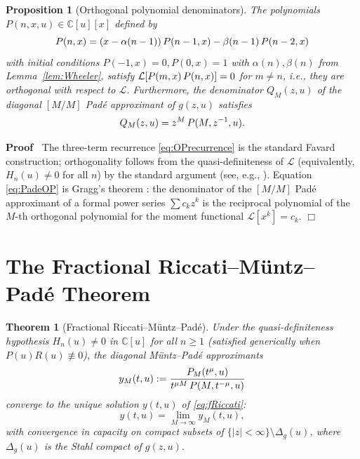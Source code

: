 \documentclass{article}
\newcommand{\assign}{:=}
\newcommand{\nequiv}{\mathrel{\not\equiv}}
\newenvironment{proof}{\noindent\textbf{Proof\ }}{\hspace*{\fill}$\Box$\medskip}
\newtheorem{proposition}{Proposition}
{\theorembodyfont{\rmfamily}\newtheorem{remark}{Remark}}
\newtheorem{theorem}{Theorem}
\newcommand{\C}{\mathbb{C}}
\newcommand{\Lk}{\mathcal{L}}
\begin{document}
\begin{proposition}
  [Orthogonal polynomial denominators]\label{prop:OPdenominator}The
  polynomials $P (n, x, u) \in \C [u] [x]$ defined by
  \begin{equation}
    P (n, x) = (x - \alpha (n - 1))  \hspace{0.17em} P (n - 1, x) - \beta (n -
    1)  \hspace{0.17em} P (n - 2, x) \label{eq:OPrecurrence}
  \end{equation}
  with initial conditions $P (- 1, x) = 0, P (0, x) = 1$ with $\alpha (n),
  \beta (n)$ from  Lemma~\ref{lem:Wheeler}, satisfy $\Lk [P (m, x)
  \hspace{0.17em} P (n, x)] = 0$ for $m \ne n$, i.e., they are orthogonal with
  respect to $\Lk$. Furthermore, the denominator $Q_M  (z, u)$ of the diagonal
  $[M / M]$ Pad{\'e} approximant of $g (z, u)$ satisfies
  \begin{equation}
    Q_M  (z, u) = z^M  \hspace{0.17em} P (M, z^{- 1}, u) . \label{eq:PadeOP}
  \end{equation}
\end{proposition}

\begin{proof}
  The three-term recurrence \eqref{eq:OPrecurrence} is the standard Favard
  construction; orthogonality follows from the quasi-definiteness of $\Lk$
  (equivalently, $H_n (u) \ne 0$ for all $n$) by the standard argument (see,
  e.g., {\cite{Chihara1978}}). Equation \eqref{eq:PadeOP} is Gragg's theorem
  {\cite{Gragg1974}}: the denominator of the $[M / M]$ Pad{\'e} approximant of
  a formal power series $\sum c_k z^k$ is the reciprocal polynomial of the
  $M$-th orthogonal polynomial for the moment functional $\Lk [x^k] = c_k$.
\end{proof}

\section{The Fractional Riccati--M{\"u}ntz--Pad{\'e}
Theorem}\label{sec:maintheorem}

\begin{theorem}
  [Fractional Riccati--M{\"u}ntz--Pad{\'e}]\label{thm:FRMP}Under the
  quasi-definiteness hypothesis $H_n (u) \ne 0$ in $\C [u]$ for all $n \ge 1$
  (satisfied generically when $P (u) R (u) \nequiv 0$), the diagonal
  M{\"u}ntz--Pad{\'e} approximants
  \begin{equation}
    y_M (t, u) \assign \frac{P_M (t^{\mu}, u)}{t^{\mu M}  \hspace{0.17em} P
    (M, t^{- \mu}, u)} \label{eq:yM}
  \end{equation}
  converge to the unique solution $y (t, u)$ of \eqref{eq:fRiccati}:
  \begin{equation}
    y (t, u) = \lim_{M \to \infty} y_M (t, u), \label{eq:convergence}
  \end{equation}
  with convergence in capacity on compact subsets of $\{|z| < \infty\}
  \setminus \Delta_g (u)$, where $\Delta_g (u)$ is the Stahl compact of $g (z,
  u)$.
\end{theorem}
\end{document}
